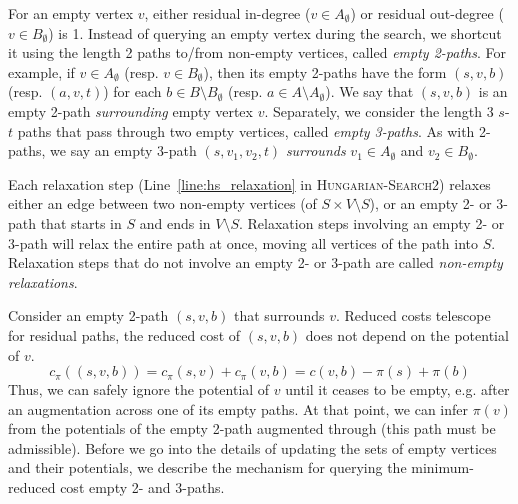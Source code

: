 \documentclass[11pt]{article}
\theoremstyle{plain}
\numberwithin{figure}{section}
\begin{document}
For an empty vertex $v$, either residual in-degree ($v \in A_\emptyset$) or
residual out-degree ($v \in B_\emptyset$) is 1.
Instead of querying an empty vertex during the search, we shortcut it using the
length 2 paths to/from non-empty vertices, called \emph{empty 2-paths}.
For example, if $v \in A_\emptyset$ (resp. $v \in B_\emptyset$), then its empty
2-paths have the form $(s, v, b)$ (resp. $(a, v, t)$) for each
$b \in B \setminus B_\emptyset$ (resp. $a \in A \setminus A_\emptyset$).
We say that $(s, v, b)$ is an empty 2-path \emph{surrounding} empty vertex $v$.
Separately, we consider the length 3 $s$-$t$ paths that pass through two empty
vertices, called \emph{empty 3-paths}.
As with 2-paths, we say an empty 3-path $(s, v_1, v_2, t)$ \emph{surrounds}
$v_1 \in A_\emptyset$ and $v_2 \in B_\emptyset$.

Each relaxation step (Line~\ref{line:hs_relaxation} in
\textsc{Hungarian-Search2}) relaxes either an edge between two non-empty
vertices (of $S \times V \setminus S$), or an empty 2- or 3-path that starts
in $S$ and ends in $V \setminus S$.
Relaxation steps involving an empty 2- or 3-path will relax the entire path
at once, moving all vertices of the path into $S$.
Relaxation steps that do not involve an empty 2- or 3-path are called
\emph{non-empty relaxations}.

Consider an empty 2-path $(s, v, b)$ that surrounds $v$.
Reduced costs telescope for residual paths, the reduced cost of $(s, v, b)$
does not depend on the potential of $v$.
\begin{equation*}
	c_\pi((s, v, b)) = c_\pi(s, v) + c_\pi(v, b) = c(v, b) - \pi(s) + \pi(b)
\end{equation*}
Thus, we can safely ignore the potential of $v$ until it ceases to be
empty, e.g. after an augmentation across one of its empty paths.
At that point, we can infer $\pi(v)$ from the potentials of the empty 2-path
augmented through (this path must be admissible).
Before we go into the details of updating the sets of empty vertices and their
potentials, we describe the mechanism for querying the minimum-reduced cost
empty 2- and 3-paths.
\end{document}
